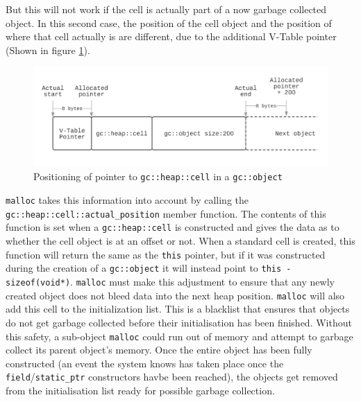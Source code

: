 \documentclass[11pt]{article}
\begin{document}
But this will not work if the cell is actually part of a now garbage collected object.
In this second case, the position of the cell object and the position of where that
cell actually is are different, due to the additional V-Table pointer
(Shown in figure \ref{fig:allocatedobject}).
\begin{figure}
\begin{center}
\includegraphics[scale=0.5]{./report_srcs/full_object_allocation.png}
\end{center}
\caption{Positioning of pointer to \texttt{gc::heap::cell} in a \texttt{gc::object}}
\label{fig:allocatedobject}
\end{figure}

\texttt{malloc} takes this information into account by calling the \texttt{gc::heap::cell::actual\_position} member function.
The contents of this function is set when a \texttt{gc::heap::cell} is constructed and gives the data as to whether the cell object
is at an offset or not. When a standard cell is created, this function will return the same as the \texttt{this} pointer, but if it
was constructed during the creation of a \texttt{gc::object} it will instead point to \texttt{this - sizeof(void*)}.
\texttt{malloc} must make this adjustment to ensure that any newly created object does not bleed data into the next heap position.
\texttt{malloc} will also add this cell to the initialization list. This is a blacklist that ensures that objects do not
get garbage collected before their initialisation has been finished. Without this safety, a sub-object \texttt{malloc}
could run out of memory and attempt to garbage collect its parent object's memory. Once the entire object has been fully constructed
(an event the system knows has taken place once the \texttt{field}/\texttt{static\_ptr} constructors havbe been reached), the objects
get removed from the initialisation list ready for possible garbage collection.
\end{document}

